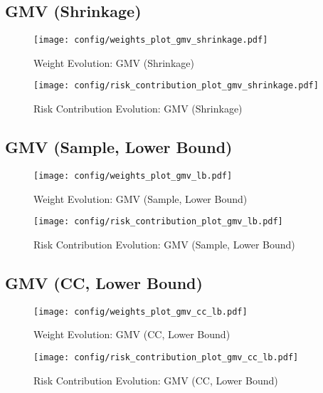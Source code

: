 \documentclass{article}
\begin{document}
\subsection{GMV (Shrinkage)}
\begin{figure}[H]
    \centering
    \texttt{[image: config/weights\_plot\_gmv\_shrinkage.pdf]}
    \caption{Weight Evolution: GMV (Shrinkage)}
    \label{fig:weights_gmv_shrinkage}
\end{figure}
\begin{figure}[H]
    \centering
    \texttt{[image: config/risk\_contribution\_plot\_gmv\_shrinkage.pdf]}
    \caption{Risk Contribution Evolution: GMV (Shrinkage)}
    \label{fig:risk_contribution_gmv_shrinkage}
\end{figure}
\clearpage

\subsection{GMV (Sample, Lower Bound)}
\begin{figure}[H]
    \centering
    \texttt{[image: config/weights\_plot\_gmv\_lb.pdf]}
    \caption{Weight Evolution: GMV (Sample, Lower Bound)}
    \label{fig:weights_gmv_lb}
\end{figure}
\begin{figure}[H]
    \centering
    \texttt{[image: config/risk\_contribution\_plot\_gmv\_lb.pdf]}
    \caption{Risk Contribution Evolution: GMV (Sample, Lower Bound)}
    \label{fig:risk_contribution_gmv_lb}
\end{figure}
\clearpage

\subsection{GMV (CC, Lower Bound)}
\begin{figure}[H]
    \centering
    \texttt{[image: config/weights\_plot\_gmv\_cc\_lb.pdf]}
    \caption{Weight Evolution: GMV (CC, Lower Bound)}
    \label{fig:weights_gmv_cc_lb}
\end{figure}
\begin{figure}[H]
    \centering
    \texttt{[image: config/risk\_contribution\_plot\_gmv\_cc\_lb.pdf]}
    \caption{Risk Contribution Evolution: GMV (CC, Lower Bound)}
    \label{fig:risk_contribution_gmv_cc_lb}
\end{figure}
\clearpage
\end{document}
